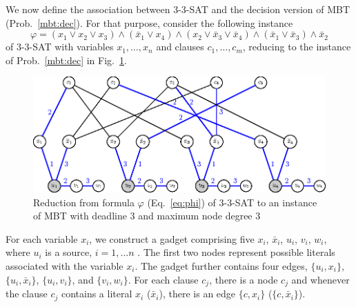 We now define the association between \textsc{3-3-SAT} and the decision version of MBT (Prob.~\ref{mbt:dec}).
For that purpose, consider the following instance 
\begin{equation}
\varphi=(x_1\vee x_2\vee x_3)\wedge(\bar{x}_1\vee x_4)\wedge(x_2\vee \bar{x}_3 \vee\bar{x}_4)\wedge(\bar{x}_1\vee \bar{x}_3)\wedge \bar{x}_2 
\label{eq:phi}
\end{equation}
of \textsc{3-3-SAT} with variables $x_1,\dots, x_n$ and clauses $c_1,\dots,c_m$, reducing to the instance of Prob.~\ref{mbt:dec} in Fig.~\ref{fig:mbtnpc}.
\begin{figure}
\centering
\includegraphics{figurer/mbtnpc.eps}
\caption{Reduction from formula $\varphi$ (Eq.~\eqref{eq:phi}) of \textsc{3-3-SAT} to an instance of MBT with deadline 3 and maximum node degree 3}
\label{fig:mbtnpc}
\end{figure}
For each variable $x_i$, we construct a gadget comprising five $x_i$, $\bar{x}_i$, $u_i$, $v_i$, $w_i$, where $u_i$ is a source, $i=1,\dots n$ .
The first two nodes represent possible literals associated with the variable $x_i$.
The gadget further contains four edges, $\{u_i,x_i\}$, $\{u_i,\bar{x}_i\}$, $\{u_i,v_i\}$, and $\{v_i,w_i\}$.
For each clause $c_j$, there is a node $c_j$ and whenever the clause $c_j$ contains a literal $x_i$ ($\bar{x}_i$), there is an edge $\{c,x_i\}$ ($\{c,\bar{x}_i\}$).

